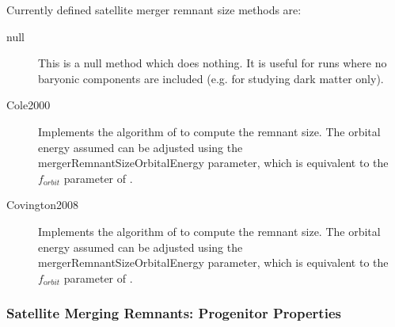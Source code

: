 Currently defined satellite merger remnant size methods are:
\begin{description}
 \item [{\normalfont \ttfamily null}] This is a null method which does nothing. It is useful for runs where no baryonic components are included (e.g. for studying dark matter only).
 \item [{\normalfont \ttfamily Cole2000}] Implements the algorithm of \cite{cole_hierarchical_2000} to compute the remnant size. The orbital energy assumed can be adjusted using the {\normalfont \ttfamily mergerRemnantSizeOrbitalEnergy} parameter, which is equivalent to the $f_{\mathrm orbit}$ parameter of \cite{cole_hierarchical_2000}.
 \item [{\normalfont \ttfamily Covington2008}] Implements the algorithm of \cite{covington_predicting_2008} to compute the remnant size. The orbital energy assumed can be adjusted using the {\normalfont \ttfamily mergerRemnantSizeOrbitalEnergy} parameter, which is equivalent to the $f_{\mathrm orbit}$ parameter of \cite{cole_hierarchical_2000}.
\end{description}

\subsubsection{Satellite Merging Remnants: Progenitor Properties}

